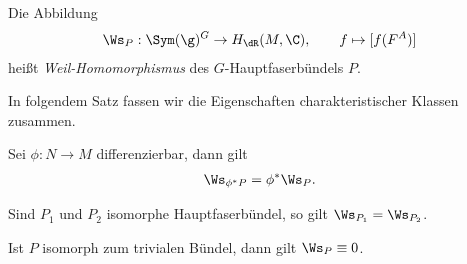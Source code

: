 \documentclass[%
	paper=a5,%
	fleqn,%
	DIV=18,%
	BCOR=0mm,
	fontsize=11pt,
	titlepage=false,%
	bibliography=totoc,
	DIV=18,%
	twoside=true,
	pdftitle=Riemannsche Geometrie,
	pdfauthor=Uwe Semmelmann,
	numbers=noendperiod]%
	{scrbook}
\begin{document}
\begin{defn}
Die Abbildung
\begin{align*}
\Ws_P : \Sym(\g)^G \to H_{\dR}(M,\C),\qquad f \mapsto [f(F^A)]
\end{align*}
heißt \emph{Weil-Homomorphismus} des $G$-Hauptfaserbündels $P$.\fish
\end{defn}

In folgendem Satz fassen wir die Eigenschaften charakteristischer Klassen
zusammen.

\begin{prop}
\begin{propenum}
\item Sei $\phi: N\to M$ differenzierbar, dann gilt
\begin{align*}
\Ws_{\phi^* P} = \phi^*\Ws_P.
\end{align*}
\item Sind $P_1$ und $P_2$ isomorphe Hauptfaserbündel, so gilt $\Ws_{P_1} =
\Ws_{P_2}$.
\item Ist $P$ isomorph zum trivialen Bündel, dann gilt $\Ws_P\equiv 0$.\fish
\end{propenum}


\end{prop}
\end{document}
